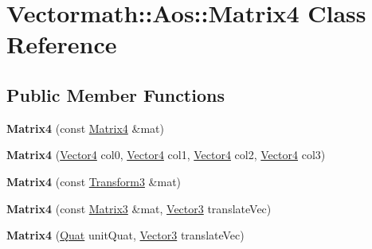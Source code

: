 \hypertarget{classVectormath_1_1Aos_1_1Matrix4}{\section{Vectormath\-:\-:Aos\-:\-:Matrix4 Class Reference}
\label{classVectormath_1_1Aos_1_1Matrix4}
}
\subsection*{Public Member Functions}
\begin{DoxyCompactItemize}
\item 
\hypertarget{classVectormath_1_1Aos_1_1Matrix4_a494b758b1cc4eadbfe225a37cf49fc02}{{\bfseries Matrix4} (const \hyperlink{classVectormath_1_1Aos_1_1Matrix4}{Matrix4} \&mat)}\label{classVectormath_1_1Aos_1_1Matrix4_a494b758b1cc4eadbfe225a37cf49fc02}

\item 
\hypertarget{classVectormath_1_1Aos_1_1Matrix4_ae3a1359ebe8482e9c86097c8eedd0f7e}{{\bfseries Matrix4} (\hyperlink{classVectormath_1_1Aos_1_1Vector4}{Vector4} col0, \hyperlink{classVectormath_1_1Aos_1_1Vector4}{Vector4} col1, \hyperlink{classVectormath_1_1Aos_1_1Vector4}{Vector4} col2, \hyperlink{classVectormath_1_1Aos_1_1Vector4}{Vector4} col3)}\label{classVectormath_1_1Aos_1_1Matrix4_ae3a1359ebe8482e9c86097c8eedd0f7e}

\item 
\hypertarget{classVectormath_1_1Aos_1_1Matrix4_aaef89fdf6ff83ab59d0037bce9c01423}{{\bfseries Matrix4} (const \hyperlink{classVectormath_1_1Aos_1_1Transform3}{Transform3} \&mat)}\label{classVectormath_1_1Aos_1_1Matrix4_aaef89fdf6ff83ab59d0037bce9c01423}

\item 
\hypertarget{classVectormath_1_1Aos_1_1Matrix4_afeb40ffb3c479a3f3fe8f7f5fb5f4400}{{\bfseries Matrix4} (const \hyperlink{classVectormath_1_1Aos_1_1Matrix3}{Matrix3} \&mat, \hyperlink{classVectormath_1_1Aos_1_1Vector3}{Vector3} translate\-Vec)}\label{classVectormath_1_1Aos_1_1Matrix4_afeb40ffb3c479a3f3fe8f7f5fb5f4400}

\item 
\hypertarget{classVectormath_1_1Aos_1_1Matrix4_aabcdcc24def2c40ff3b629693406bb64}{{\bfseries Matrix4} (\hyperlink{classVectormath_1_1Aos_1_1Quat}{Quat} unit\-Quat, \hyperlink{classVectormath_1_1Aos_1_1Vector3}{Vector3} translate\-Vec)}\label{classVectormath_1_1Aos_1_1Matrix4_aabcdcc24def2c40ff3b629693406bb64}


\end{DoxyCompactItemize}
